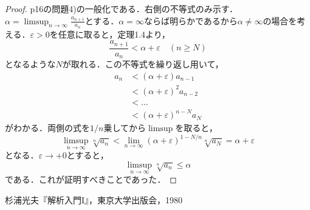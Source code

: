 \documentclass[a4paper,10pt,fleqn]{ltjsarticle}
\begin{document}
  \begin{leftbar}
    \begin{proof}
      p16の問題4)の一般化である．右側の不等式のみ示す．
      $\alpha = \limsup _{n \to \infty} \frac{a_{n+1}}{a_{n}}$とする．$\alpha = \infty$ならば明らかであるから$\alpha \neq \infty$の場合を考える．$\varepsilon > 0$を任意に取ると，定理1.4より，
      \[
        \frac{a_{n+1}}{a_{n}} < \alpha + \varepsilon \quad (n \geq N)
      \]
      となるような$N$が取れる．この不等式を繰り返し用いて，
      \begin{align*}
        a_n
        &< (\alpha + \varepsilon) a_{n-1} \\
        &< (\alpha + \varepsilon)^2 a_{n-2} \\
        &< \ldots \\
        &< (\alpha + \varepsilon)^{n-N} a_N
      \end{align*}
      がわかる．両側の式を$1/n$乗してから$\limsup$を取ると，
      \[
        \limsup _{n \to \infty} \sqrt[n]{a_n} < \lim _{n \to \infty} (\alpha + \varepsilon)^{1-N/n} \sqrt[n]{a_N} = \alpha + \varepsilon 
      \]
      となる．$\varepsilon \to +0$とすると，
      \[
        \limsup _{n \to \infty} \sqrt[n]{a_n} \leq \alpha
      \]
      である．これが証明すべきことであった．
    \end{proof}
  \end{leftbar}

\newpage 

\begin{thebibliography}{9}
	 杉浦光夫『解析入門I』，東京大学出版会，1980
\end{thebibliography}
\end{document}
